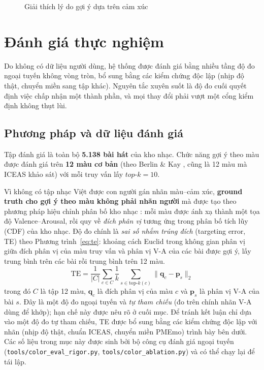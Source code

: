\documentclass[../DoAn.tex]{subfiles}
\begin{document}
\begin{figure}[h!]
\centering
{}
\caption{Giải thích lý do gợi ý dựa trên cảm xúc}
\label{fig:ui-why}
\end{figure}

\section{Đánh giá thực nghiệm}
\label{section:eval}
Do không có dữ liệu người dùng, hệ thống được đánh giá bằng nhiều tầng độ đo ngoại tuyến không vòng tròn, bổ sung bằng các kiểm chứng độc lập (nhịp độ thật, chuyển miền sang tập khác). Nguyên tắc xuyên suốt là độ đo cuối quyết định việc chấp nhận một thành phần, và mọi thay đổi phải vượt một cổng kiểm định không thụt lùi.

\subsection{Phương pháp và dữ liệu đánh giá}
\label{subsection:eval-method}
Tập đánh giá là toàn bộ \textbf{5.138 bài hát} của kho nhạc. Chức năng gợi ý theo màu được đánh giá trên \textbf{12 màu cơ bản} (theo Berlin \& Kay \cite{berlin1969basic}, cũng là 12 màu mà ICEAS \cite{jonauskaite2020universal} khảo sát) với mỗi truy vấn lấy $top\text{-}k=10$.

Vì không có tập nhạc Việt được con người gán nhãn màu--cảm xúc, \textbf{ground truth cho gợi ý theo màu không phải nhãn người} mà được tạo theo phương pháp hiệu chỉnh phân bố kho nhạc \cite{steck2018calibrated}: mỗi màu được ánh xạ thành một tọa độ Valence--Arousal, rồi quy về \textit{đích phân vị} tương ứng trong phân bố tích lũy (CDF) của kho nhạc. Độ đo chính là \textit{sai số nhắm trúng đích} (targeting error, TE) theo Phương trình~\eqref{eq:te}: khoảng cách Euclid trong không gian phân vị giữa đích phân vị của màu truy vấn và phân vị V-A của các bài được gợi ý, lấy trung bình trên các bài rồi trung bình trên 12 màu.
\begin{equation}\label{eq:te}
    \text{TE} = \frac{1}{|C|}\sum_{c \in C} \frac{1}{k}\sum_{s \in \text{top-}k(c)} \big\lVert \mathbf{q}_c - \mathbf{p}_s \big\rVert_2
\end{equation}
trong đó $C$ là tập 12 màu, $\mathbf{q}_c$ là đích phân vị của màu $c$ và $\mathbf{p}_s$ là phân vị V-A của bài $s$. Đây là một độ đo ngoại tuyến và \textit{tự tham chiếu} (đo trên chính nhãn V-A dùng để khớp); hạn chế này được nêu rõ ở cuối mục. Để tránh kết luận chỉ dựa vào một độ đo tự tham chiếu, TE được bổ sung bằng các kiểm chứng độc lập với nhãn (nhịp độ thật, chuẩn ICEAS, chuyển miền PMEmo) trình bày bên dưới. Các số liệu trong mục này được sinh bởi bộ công cụ đánh giá ngoại tuyến (\texttt{tools/color\_eval\_rigor.py}, \texttt{tools/color\_ablation.py}) và có thể chạy lại để tái lập.
\end{document}
